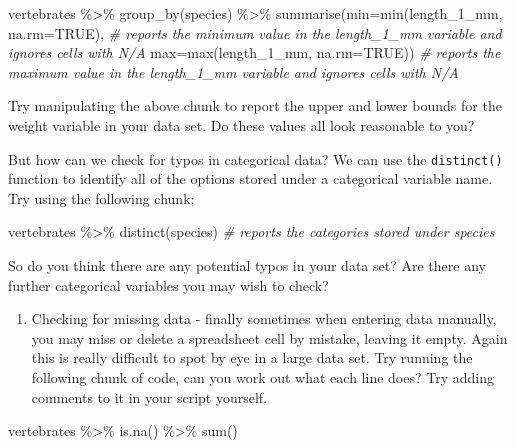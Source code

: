 \documentclass[
]{book}
\newenvironment{Shaded}{\begin{snugshade}}{\end{snugshade}}
\newcommand{\AttributeTok}[1]{\textcolor[rgb]{0.77,0.63,0.00}{#1}}
\newcommand{\CommentTok}[1]{\textcolor[rgb]{0.56,0.35,0.01}{\textit{#1}}}
\newcommand{\ConstantTok}[1]{\textcolor[rgb]{0.00,0.00,0.00}{#1}}
\newcommand{\FunctionTok}[1]{\textcolor[rgb]{0.00,0.00,0.00}{#1}}
\newcommand{\NormalTok}[1]{#1}
\newcommand{\SpecialCharTok}[1]{\textcolor[rgb]{0.00,0.00,0.00}{#1}}
\providecommand{\tightlist}{%
  \setlength{\itemsep}{0pt}\setlength{\parskip}{0pt}}
\begin{document}
\begin{Shaded}
\begin{Highlighting}[]
\NormalTok{vertebrates }\SpecialCharTok{\%\textgreater{}\%} 
  \FunctionTok{group\_by}\NormalTok{(species) }\SpecialCharTok{\%\textgreater{}\%} 
  \FunctionTok{summarise}\NormalTok{(}\AttributeTok{min=}\FunctionTok{min}\NormalTok{(length\_1\_mm, }\AttributeTok{na.rm=}\ConstantTok{TRUE}\NormalTok{), }\CommentTok{\# reports the minimum value in the length\_1\_mm variable and ignores cells with N/A}
            \AttributeTok{max=}\FunctionTok{max}\NormalTok{(length\_1\_mm, }\AttributeTok{na.rm=}\ConstantTok{TRUE}\NormalTok{)) }\CommentTok{\# reports the maximum value in the length\_1\_mm variable and ignores cells with N/A}
\end{Highlighting}
\end{Shaded}

Try manipulating the above chunk to report the upper and lower bounds for the weight variable in your data set. Do these values all look reasonable to you?

But how can we check for typos in categorical data? We can use the \texttt{distinct()} function to identify all of the options stored under a categorical variable name. Try using the following chunk;

\begin{Shaded}
\begin{Highlighting}[]
\NormalTok{vertebrates }\SpecialCharTok{\%\textgreater{}\%} 
  \FunctionTok{distinct}\NormalTok{(species) }\CommentTok{\# reports the categories stored under species}
\end{Highlighting}
\end{Shaded}

So do you think there are any potential typos in your data set? Are there any further categorical variables you may wish to check?

\begin{enumerate}
\def\labelenumi{\arabic{enumi})}
\setcounter{enumi}{2}
\tightlist
\item
  Checking for missing data - finally sometimes when entering data manually, you may miss or delete a spreadsheet cell by mistake, leaving it empty. Again this is really difficult to spot by eye in a large data set. Try running the following chunk of code, can you work out what each line does? Try adding comments to it in your script yourself.
\end{enumerate}

\begin{Shaded}
\begin{Highlighting}[]
\NormalTok{vertebrates }\SpecialCharTok{\%\textgreater{}\%} 
  \FunctionTok{is.na}\NormalTok{() }\SpecialCharTok{\%\textgreater{}\%} 
  \FunctionTok{sum}\NormalTok{()}
\end{Highlighting}
\end{Shaded}
\end{document}

